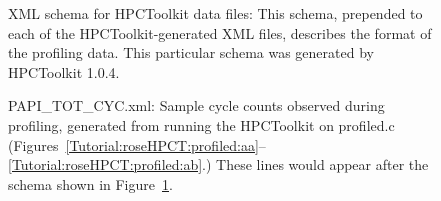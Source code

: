 \begin{figure}[!h]
{\indent
{\mySmallFontSize
\begin{latexonly}
   
\end{latexonly}

\begin{htmlonly}
   
\end{htmlonly}

}
}
\caption{XML schema for HPCToolkit data files: This schema, prepended
to each of the HPCToolkit-generated XML files, describes the format of
the profiling data. This particular schema was generated by HPCToolkit
1.0.4.}
\label{Tutorial:roseHPCT:xml:schema}
\end{figure}

\begin{figure}[!h]
{\indent
{\mySmallFontSize
\begin{latexonly}
   
\end{latexonly}

\begin{htmlonly}
   
\end{htmlonly}

}
}
\caption{PAPI\_TOT\_CYC.xml: Sample cycle counts observed during
profiling, generated from running the HPCToolkit on profiled.c
(Figures~\ref{Tutorial:roseHPCT:profiled:aa}--\ref{Tutorial:roseHPCT:profiled:ab}.)
These lines would appear after the schema shown in
Figure~\ref{Tutorial:roseHPCT:xml:schema}.}
\label{Tutorial:roseHPCT:xml:cycles}
\end{figure}

